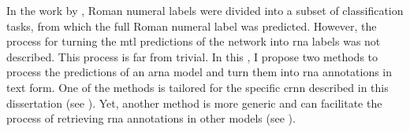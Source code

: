 
In the work by \textcite{chen2018functional}, Roman numeral
labels were divided into a subset of classification tasks,
from which the full Roman numeral label was predicted.
However, the process for turning the \gls{mtl} predictions
of the network into \gls{rna} labels was not described. This
process is far from trivial. In this \thesisdiss{}, I
propose two methods to process the predictions of an
\gls{arna} model and turn them into \gls{rna} annotations in
text form. One of the methods is tailored for the specific
\gls{crnn} described in this dissertation (see
). Yet, another method is more
generic and can facilitate the process of retrieving
\gls{rna} annotations in other models (see
).
